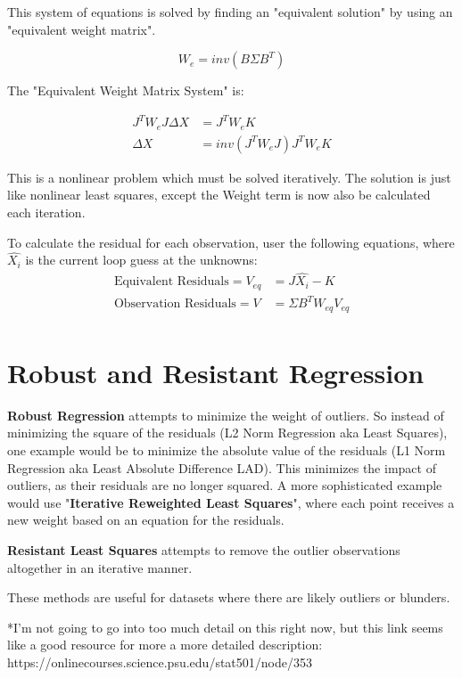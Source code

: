 This system of equations is solved by finding an "equivalent solution" by using an "equivalent weight matrix".

\[
W_e = inv(B \Sigma B^T)
\]

The "Equivalent Weight Matrix System" is:

\begin{align*}
J^TW_eJ\Delta X &= J^TW_eK \\
\Delta X &= inv(J^TW_eJ)J^TW_eK 
\end{align*}

This is a nonlinear problem which must be solved iteratively.  The solution is just like nonlinear least squares, except the Weight term is now also be calculated each iteration.

To calculate the residual for each observation, user the following equations, where $\hat{X_i}$ is the current loop guess at the unknowns:
\begin{align*}
	\text{Equivalent Residuals} = V_{eq} &= J\hat{X_i} - K \\
	\text{Observation Residuals} = V &= \Sigma B^T W_{eq} V_{eq} \\
\end{align*}

\section{Robust and Resistant Regression}
\textbf{Robust Regression} attempts to minimize the weight of outliers.  So instead of minimizing the square of the residuals (L2 Norm Regression aka Least Squares), one example would be to minimize the absolute value of the residuals (L1 Norm Regression aka Least Absolute Difference LAD).  This minimizes the impact of outliers, as their residuals are no longer squared.  A more sophisticated example would use "\textbf{Iterative Reweighted Least Squares}", where each point receives a new weight based on an equation for the residuals.

\noindent
\textbf{Resistant Least Squares} attempts to remove the outlier observations altogether in an iterative manner.  

\vspace{0.5cm}
\noindent
These methods are useful for datasets where there are likely outliers or blunders.

\noindent
*I'm not going to go into too much detail on this right now, but this link seems like a good resource for more a more detailed description: https://onlinecourses.science.psu.edu/stat501/node/353
